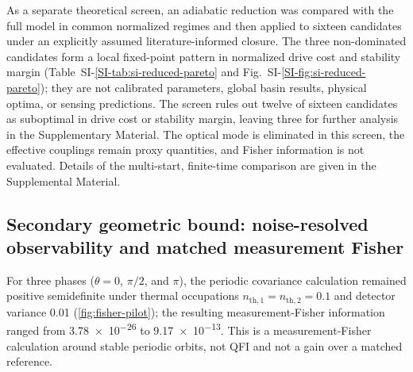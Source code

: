 \documentclass[Phys]{SciPost}
\begin{document}
As a separate theoretical screen, an adiabatic reduction was compared with the full model in common normalized regimes and then applied to sixteen candidates under an explicitly assumed literature-informed closure. The three non-dominated candidates form a local fixed-point pattern in normalized drive cost and stability margin (Table~SI-\ref{SI-tab:si-reduced-pareto} and Fig.~SI-\ref{SI-fig:si-reduced-pareto}); they are not calibrated parameters, global basin results, physical optima, or sensing predictions. The screen rules out twelve of sixteen candidates as suboptimal in drive cost or stability margin, leaving three for further analysis in the Supplementary Material. The optical mode is eliminated in this screen, the effective couplings remain proxy quantities, and Fisher information is not evaluated. Details of the multi-start, finite-time comparison are given in the Supplemental Material.

\subsection{Secondary geometric bound: noise-resolved observability and matched measurement Fisher}

For three phases ($\theta=0$, $\pi/2$, and $\pi$), the periodic covariance calculation remained positive semidefinite under thermal occupations $n_{\mathrm{th},1}=n_{\mathrm{th},2}=\num{0.1}$ and detector variance \num{0.01} (\cref{fig:fisher-pilot}); the resulting measurement-Fisher information ranged from \num{3.78e-26} to \num{9.17e-13}. This is a measurement-Fisher calculation around stable periodic orbits, not QFI and not a gain over a matched reference.
\end{document}
